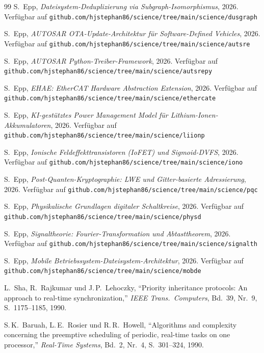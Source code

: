 ﻿\documentclass[a4paper,12pt]{scrreprt}
\theoremstyle{definition}
\begin{document}
\begin{thebibliography}{99}
		S.\ Epp,
		\textit{Dateisystem-Deduplizierung via Subgraph-Isomorphismus}, 2026. Verfügbar auf
		\texttt{github.com/hjstephan86/science/tree/main/science/dusgraph}
		
		S.\ Epp,
		\textit{AUTOSAR OTA-Update-Architektur für Software-Defined Vehicles}, 2026. Verfügbar auf
		\texttt{github.com/hjstephan86/science/tree/main/science/autsre}
		
		S.\ Epp,
		\textit{AUTOSAR Python-Treiber-Framework}, 2026. Verfügbar auf
		\texttt{github.com/hjstephan86/science/tree/main/science/autsrepy}
		
		S.\ Epp,
		\textit{EHAE: EtherCAT Hardware Abstraction Extension}, 2026. Verfügbar auf
		\texttt{github.com/hjstephan86/science/tree/main/science/ethercate}
		
		S.\ Epp,
		\textit{KI-gestütztes Power Management Model für Lithium-Ionen-Akkumulatoren}, 2026. Verfügbar auf \texttt{github.com/hjstephan86/science/tree/main/science/liionp}
		
		S.\ Epp,
		\textit{Ionische Feldeffekttransistoren (IoFET) und Sigmoid-DVFS}, 2026. Verfügbar auf
		\texttt{github.com/hjstephan86/science/tree/main/science/iono}
		
		S.\ Epp,
		\textit{Post-Quanten-Kryptographie: LWE und Gitter-basierte Adressierung}, 2026. Verfügbar auf
		\texttt{github.com/hjstephan86/science/tree/main/science/pqc}
		
		S.\ Epp,
		\textit{Physikalische Grundlagen digitaler Schaltkreise}, 2026. Verfügbar auf
		\texttt{github.com/hjstephan86/science/tree/main/science/physd}
		
		S.\ Epp,
		\textit{Signaltheorie: Fourier-Transformation und Abtasttheorem}, 2026. Verfügbar auf
		\texttt{github.com/hjstephan86/science/tree/main/science/signalth}
		
		S.\ Epp,
		\textit{Mobile Betriebssystem-Dateisystem-Architektur}, 2026. Verfügbar auf
		\texttt{github.com/hjstephan86/science/tree/main/science/mobde}
		
		L.\ Sha, R.\ Rajkumar und J.\,P.\ Lehoczky,
		``Priority inheritance protocols: An approach to real-time synchronization,''
		\textit{IEEE Trans.\ Computers}, Bd.~39, Nr.~9, S.~1175--1185, 1990.
		
		S.\,K.\ Baruah, L.\,E.\ Rosier und R.\,R.\ Howell,
		``Algorithms and complexity concerning the preemptive scheduling of
		periodic, real-time tasks on one processor,''
		\textit{Real-Time Systems}, Bd.~2, Nr.~4, S.~301--324, 1990.
		

\end{thebibliography}
\end{document}

